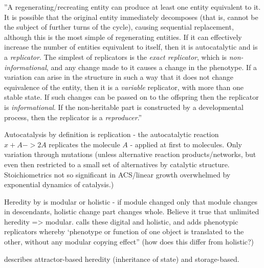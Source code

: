 ''A regenerating/recreating entity can produce at least
one entity equivalent to it. It is possible that the original
entity immediately decomposes (that is, cannot be the
subject of further turns of the cycle), causing sequential
replacement, although this is the most simple of regenerating
entities. If it can effectively increase the number
of entities equivalent to itself, then it is autocatalytic
and is a \emph{replicator}. The simplest of replicators is the
\emph{exact replicator}, which is \emph{non-informational}, and any
change made to it causes a change in the phenotype. If
a variation can arise in the structure in such a way that
it does not change equivalence of the entity, then it is a
\emph{variable} replicator, with more than one stable state. If
such changes can be passed on to the offspring then the
replicator is \emph{informational}. If the non-heritable part is
constructed by a developmental process, then the replicator
is a \emph{reproducer}.'' \parencite[p.21]{Zachar2010}

Autocatalysis by definition is replication - the autocatalytic reaction $x+A->2A$ replicates the molecule $A$ \cite{Lifson1997} - applied at first to molecules. Only variation through mutations (unless alternative reaction products/networks, but even then restricted to a small set of alternatives by catalytic structure. Stoichiometrics not so significant in ACS/linear growth overwhelmed by exponential dynamics of catalysis.)

Heredity by \cite{MaynardSmith1999} is modular or holistic - if module changed only that module changes in descendants, holistic change part changes whole. Believe it true that unlimited heredity => modular. \cite{Szathmary1999} calls these digital and holistic, and adds phenotypic replicators whereby ‘phenotype or function of one object is translated to the other, without any modular copying effect” (how does this differ from holistic?)

\cite{Hogeweg1997} describes attractor-based heredity (inheritance of state) and storage-based. 

